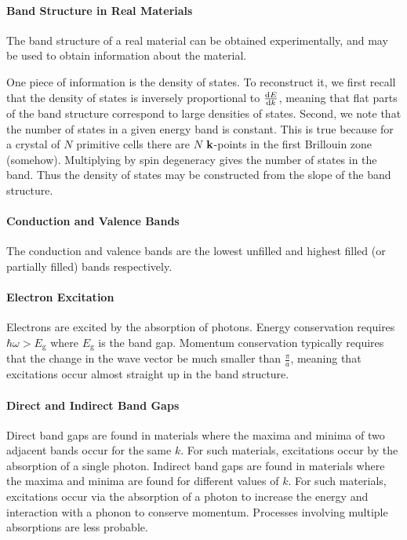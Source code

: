 \paragraph{Band Structure in Real Materials}
The band structure of a real material can be obtained experimentally, and may be used to obtain information about the material.

One piece of information is the density of states. To reconstruct it, we first recall that the density of states is inversely proportional to $\dv{E}{k}$, meaning that flat parts of the band structure correspond to large densities of states. Second, we note that the number of states in a given energy band is constant. This is true because for a crystal of $N$ primitive cells there are $N$ $\vb{k}$-points in the first Brillouin zone (somehow). Multiplying by spin degeneracy gives the number of states in the band. Thus the density of states may be constructed from the slope of the band structure.

\paragraph{Conduction and Valence Bands}
The conduction and valence bands are the lowest unfilled and highest filled (or partially filled) bands respectively.

\paragraph{Electron Excitation}
Electrons are excited by the absorption of photons. Energy conservation requires $\hbar\omega > E_{\text{g}}$ where $E_{\text{g}}$ is the band gap. Momentum conservation typically requires that the change in the wave vector be much smaller than $\frac{\pi}{a}$, meaning that excitations occur almost straight up in the band structure.

\paragraph{Direct and Indirect Band Gaps}
Direct band gaps are found in materials where the maxima and minima of two adjacent bands occur for the same $k$. For such materials, excitations occur by the absorption of a single photon. Indirect band gaps are found in materials where the maxima and minima are found for different values of $k$. For such materials, excitations occur via the absorption of a photon to increase the energy and interaction with a phonon to conserve momentum. Processes involving multiple absorptions are less probable.

